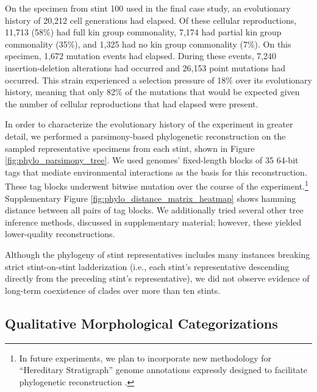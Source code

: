 On the specimen from stint 100 used in the final case study, an evolutionary history of 20,212 cell generations had elapsed.
Of these cellular reproductions, 11,713 (58\%) had full kin group commonality, 7,174 had partial kin group commonality (35\%), and 1,325 had no kin group commonality (7\%).
On this specimen, 1,672 mutation events had elapsed.
During these events, 7,240 insertion-deletion alterations had occurred and 26,153 point mutations had occurred.
This strain experienced a selection pressure of 18\% over its evolutionary history, meaning that only 82\% of the mutations that would be expected given the number of cellular reproductions that had elapsed were present.



In order to characterize the evolutionary history of the experiment in greater detail, we performed a parsimony-based phylogenetic reconstruction on the sampled representative specimens from each stint, shown in Figure \ref{fig:phylo_parsimony_tree}.
We used genomes' fixed-length blocks of 35 64-bit tags that mediate environmental interactions as the basis for this reconstruction.
These tag blocks underwent bitwise mutation over the course of the experiment.\footnote{
In future experiments, we plan to incorporate new methodology for ``Hereditary Stratigraph'' genome annotations expressly designed to facilitate phylogenetic reconstruction \citep{moreno2022hereditary}.
}
Supplementary Figure \ref{fig:phylo_distance_matrix_heatmap} shows hamming distance between all pairs of tag blocks.
We additionally tried several other tree inference methods, discussed in supplementary material; however, these yielded lower-quality reconstructions.

Although the phylogeny of stint representatives includes many instances breaking strict stint-on-stint ladderization (i.e., each stint's representative descending directly from the preceding stint's representative), we did not observe evidence of long-term coexistence of clades over more than ten stints.

\subsection{Qualitative Morphological Categorizations}

